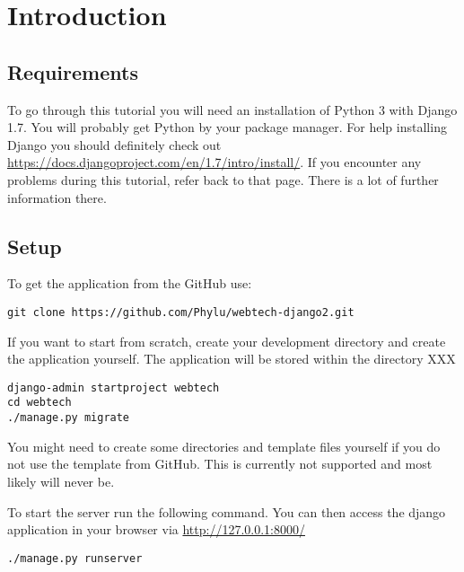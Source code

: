 \section{Introduction}

\subsection{Requirements}

To go through this tutorial you will need an installation of Python 3 with Django 1.7. You will probably get Python by your package manager. For help installing Django you should definitely check out \url{https://docs.djangoproject.com/en/1.7/intro/install/}. If you encounter any problems during this tutorial, refer back to that page. There is a lot of further information there.

\subsection{Setup}
To get the application from the GitHub use:
\begin{lstlisting}[style=Bash, caption=Clone application, label=lst:clone_app]
git clone https://github.com/Phylu/webtech-django2.git
\end{lstlisting}

If you want to start from scratch, create your development directory and create the application yourself. The application will be stored within the directory XXX
\begin{lstlisting}[style=Bash, caption=Create application, label=lst:create_app]
django-admin startproject webtech
cd webtech
./manage.py migrate
\end{lstlisting}

You might need to create some directories and template files yourself if you do not use the template from GitHub. This is currently not supported and most likely will never be.

To start the server run the following command. You can then access the django application in your browser via \url{http://127.0.0.1:8000/}
\begin{lstlisting}[style=Bash, caption=Run development server, label=lst:run_server]
./manage.py runserver
\end{lstlisting}